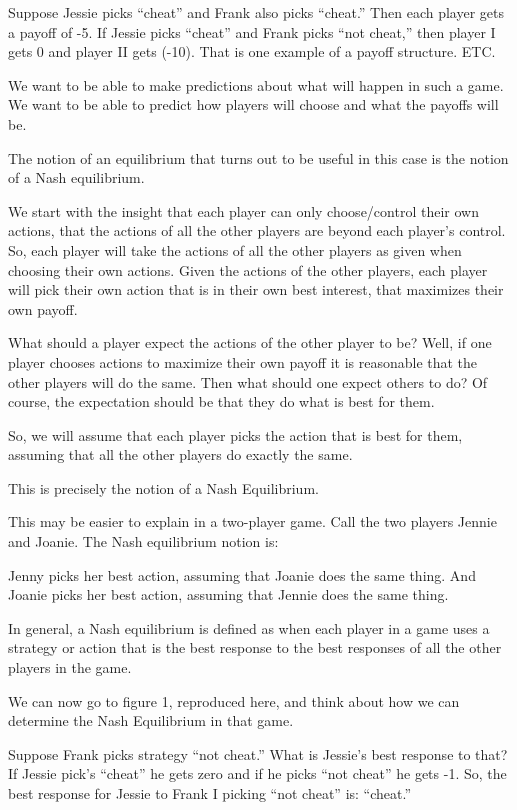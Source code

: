 \documentclass[
]{book}
\begin{document}
Suppose Jessie picks ``cheat'' and Frank also picks ``cheat.'' Then each player gets a payoff of -5. If Jessie picks ``cheat'' and Frank picks ``not cheat,'' then player I gets 0 and player II gets (-10). That is one example of a payoff structure. ETC.

We want to be able to make predictions about what will happen in such a game. We want to be able to predict how players will choose and what the payoffs will be.

The notion of an equilibrium that turns out to be useful in this case is the notion of a
Nash equilibrium.

We start with the insight that each player can only choose/control their own actions, that the actions of all the other players are beyond each player's control. So, each player will take the actions of all the other players as given when choosing their own actions. Given the actions of the other players, each player will pick their own action that is in their own best interest, that maximizes their own payoff.

What should a player expect the actions of the other player to be? Well, if one player chooses actions to maximize their own payoff it is reasonable that the other players will do the same. Then what should one expect others to do? Of course, the expectation should be that they do what is best for them.

So, we will assume that each player picks the action that is best for them, assuming that all the other players do exactly the same.

This is precisely the notion of a Nash Equilibrium.

This may be easier to explain in a two-player game. Call the two players Jennie and Joanie. The Nash equilibrium notion is:

\begin{center}
Jenny picks her best action, assuming that Joanie does the same thing.
And
Joanie picks her best action, assuming that Jennie does the same thing.

\end{center}

In general, a Nash equilibrium is defined as when each player in a game uses a strategy or action that is the best response to the best responses of all the other players in the game.

We can now go to figure 1, reproduced here, and think about how we can determine the Nash Equilibrium in that game.

Suppose Frank picks strategy ``not cheat.'' What is Jessie's best response to that? If Jessie pick's ``cheat'' he gets zero and if he picks ``not cheat'' he gets -1. So, the best response for Jessie to Frank I picking ``not cheat'' is: ``cheat.''
\end{document}
